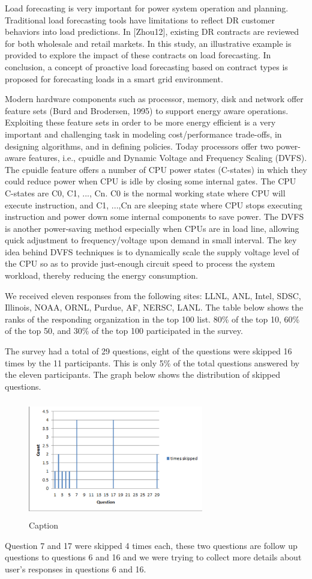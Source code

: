 Load forecasting is very important for power system operation and planning.
Traditional load forecasting tools have limitations to reflect DR customer
behaviors into load predictions. In [Zhou12], existing DR contracts are
reviewed for both wholesale and retail markets. In this study, an
illustrative example is provided to explore the impact of these contracts on
load forecasting. In conclusion, a concept of proactive load forecasting
based on contract types is proposed for forecasting loads in a smart grid
environment.

Modern hardware components such as processor, memory, disk and network offer
feature sets (Burd and Brodersen, 1995) to support energy aware operations.
Exploiting these feature sets in order to be more energy efficient is a very
important and challenging task in modeling cost/performance trade-offs, in
designing algorithms, and in defining policies. Today processors offer two
power-aware features, i.e., cpuidle and Dynamic Voltage and Frequency
Scaling (DVFS). The cpuidle feature offers a number of CPU power states
(C-states) in which they could reduce power when CPU is idle by closing some
internal gates. The CPU C-states are C0, C1, ..., Cn. C0 is the normal
working state where CPU will execute instruction, and C1, ...,Cn are
sleeping state where CPU stops executing instruction and power down some
internal components to save power. The DVFS is another power-saving method
especially when CPUs are in load line, allowing quick adjustment to
frequency/voltage upon demand in small interval. The key idea behind DVFS
techniques is to dynamically scale the supply voltage level of the CPU so as
to provide just-enough circuit speed to process the system workload, thereby
reducing the energy consumption.

We received eleven responses from the following sites: LLNL, ANL, Intel,
SDSC, Illinois, NOAA, ORNL, Purdue, AF, NERSC, LANL. The table below shows
the ranks of the responding organization in the top 100 list. 80{\%} of the
top 10, 60{\%} of the top 50, and 30{\%} of the top 100 participated in the
survey.


The survey had a total of 29 questions, eight of the questions were skipped
16 times by the 11 participants. This is only 5{\%} of the total questions
answered by the eleven participants. The graph below shows the distribution
of skipped questions.


\begin{figure}[htbp]
\includegraphics[width=3.01in,height=2.01in]{figure2}
\caption{Caption }
\end{figure}


Question 7 and 17 were skipped 4 times each, these two questions are follow
up questions to questions 6 and 16 and we were trying to collect more
details about user's responses in questions 6 and 16.

